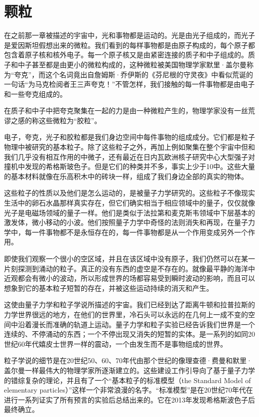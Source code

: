 	\chapter{颗粒}
\indent

   在之前那一章被描述的宇宙中，光和事物都是运动的。光是由光子组成的，而光子是爱因斯坦假想出来的微粒。我们看到的每样事物都是由原子构成的，每个原子都包含着原子核和核外电子。每一个原子核又是由紧密连接的质子和中子组成的。质子和中子甚至都是由更小的微粒构成的，这种微粒被美国物理学家默里·盖尔曼称为“夸克”，而这个名词竟出自詹姆斯·乔伊斯的《芬尼根的守灵夜》中看似荒诞的一句话“为马克检阅者王三声夸克！”不管怎样，我们接触的每一件事物都是由电子和一些夸克组成的。

    在质子和中子中把夸克聚集在一起的力是由一种微粒产生的，物理学家没有一丝荒谬之感的称这些微粒为“胶粒”。

    电子，夸克，光子和胶粒都是我们身边空间中每件事物的组成成分。它们都是粒子物理中被研究的基本粒子。除了这些粒子之外，再加上例如聚集在整个宇宙中但和我们几乎没有相互作用的中微子，还有最近在日内瓦欧洲核子研究中心大型强子对撞机中发现的希格斯玻色子。但是它们的种类并不多，事实上少于10中。这些大量的基本材料就像在乐高积木中的砖块一样，组成了我们身边全部的真实的物体。

    这些粒子的性质以及他们是怎么运动的，是被量子力学研究的。这些粒子不像现实生活中的卵石水晶那样真实存在，但它们确实相当于相应领域中的量子，仅仅就像光子是电磁场领域的量子一样。他们是类似于法拉第和麦克斯韦领域中下层基本的激发体，微小移动的小波。他们按照量子力学中奇怪的法则消失和再现，在量子力学中，每一件事物都不是永恒存在的，每一件事物都是从一个作用变成另外一个作用。

    即使我们观察一个很小的空区域，并且在该区域中没有原子，我们仍然可以在某一片刻探测到涌动的粒子。真正的没有东西的虚空是不存在的。就像最平静的海洋中近观都会有微小的波动，所以形成世界的场都容易受到瞬时波动的影响，而且可以想象到它的基本粒子短暂的存在，并被这些运动持续的消灭和产生。

    这使由量子力学和粒子学说所描述的宇宙。我们已经到达了距离牛顿和拉普拉斯的力学世界很远的地方，在他们的世界里，冷石头可以永远的在几何上一成不变的空间中沿着漫长而准确的轨道上运动。量子力学和粒子实验已经告诉我们世界是一个连续的、不停涌动的东西；一个不停出现又消失的短暂的实体。是一系列的如同20世纪60年代嬉皮士世界一样的震动，一个由发生而不是事物组成的世界。

    粒子学说的细节是在20世纪50、60、70年代由那个世纪的像理查德·费曼和默里·盖尔曼一样最伟大的物理学家所逐渐建立的。这些建设工作引导向了基于量子力学的错综复杂的理论，并且有了一个“基本粒子的标准模型（the Standard Model of elementary particles）”这样一个非常浪漫的名字。“标准模型”是在20世纪70年代在进行一系列证实了所有预言的实验后总结出来的。它在2013年发现希格斯波色子后最终确立。

